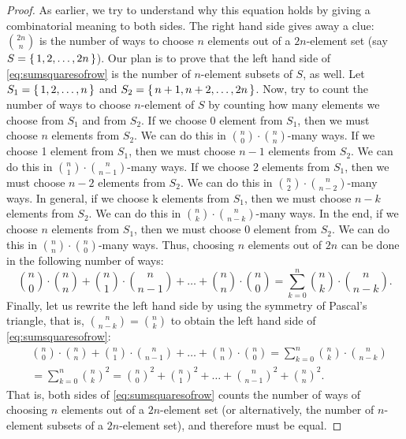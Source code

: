 \begin{proof}
As earlier, we try to understand why this equation holds by giving a combinatorial meaning to both sides. 
The right hand side gives away a clue: $\binom{2n}{n}$ is the number of ways to choose $n$ elements out of a $2n$-element set 
(say $S = \left\{\,1, 2, \dots , 2n\,\right\}$). 
Our plan is to prove that the left hand side of \eqref{eq:sumsquaresofrow} is the number of $n$-element subsets of $S$, as well. 
Let $S_1 = \left\{\,1, 2, \dots , n\,\right\}$ and $S_2 = \left\{\,n+1, n+2, \dots , 2n\,\right\}$. 
Now, try to count the number of ways to choose $n$-element of $S$ by counting how many elements we choose from $S_1$ and from $S_2$. 
If we choose 0 element from $S_1$, then we must choose $n$ elements from $S_2$. 
We can do this in $\binom{n}{0} \cdot \binom{n}{n}$-many ways. 
If we choose 1 element from $S_1$, then we must choose $n-1$ elements from $S_2$. 
We can do this in $\binom{n}{1} \cdot \binom{n}{n-1}$-many ways. 
If we choose 2 elements from $S_1$, then we must choose $n-2$ elements from $S_2$. 
We can do this in $\binom{n}{2} \cdot \binom{n}{n-2}$-many ways. 
In general, if we choose k elements from $S_1$, then we must choose $n-k$ elements from $S_2$. 
We can do this in $\binom{n}{k} \cdot \binom{n}{n-k}$-many ways. 
In the end, if we choose $n$ elements from $S_1$, then we must choose $0$ element from $S_2$. 
We can do this in $\binom{n}{n} \cdot \binom{n}{0}$-many ways. 
Thus, choosing $n$ elements out of $2n$ can be done in the following number of ways: 
\[
\binom{n}{0} \cdot \binom{n}{n} + \binom{n}{1} \cdot \binom{n}{n-1} + \dots %
+ \binom{n}{n}\cdot \binom{n}{0} = \sum_{k=0}^n \binom{n}{k} \cdot \binom{n}{n-k}. 
\]
Finally, 
let us rewrite the left hand side by using the symmetry of Pascal's triangle, 
that is, $\binom{n}{n-k} = \binom{n}{k}$ to obtain the left hand side of \eqref{eq:sumsquaresofrow}: 
\begin{align*}
& \binom{n}{0} \cdot \binom{n}{n} + \binom{n}{1} \cdot \binom{n}{n-1} + \dots %
+ \binom{n}{n}\cdot \binom{n}{0} = \sum_{k=0}^n \binom{n}{k} \cdot \binom{n}{n-k} \\
&= \sum_{k=0}^{n} \binom{n}{k}^2 = \binom{n}{0}^2 + \binom{n}{1}^2 + \dots + \binom{n}{n-1}^2 + \binom{n}{n}^2. 
\end{align*}
That is, both sides of \eqref{eq:sumsquaresofrow} counts the number of ways of choosing $n$ elements out of a $2n$-element set 
(or alternatively, the number of $n$-element subsets of a $2n$-element set), 
and therefore must be equal. 
\end{proof}

